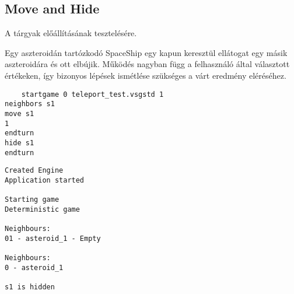 \documentclass[../../projlab]{subfiles}
\begin{document}
\subsection{Move and Hide}
\begin{test-case-description}
    A tárgyak előállításának tesztelésére.
\end{test-case-description}
\begin{test-case-function}
    Egy aszteroidán tartózkodó SpaceShip egy kapun keresztül ellátogat egy másik aszteroidára és ott elbújik. \newline
    Működés nagyban függ a felhasználó által választott értékeken, így bizonyos lépések ismétlése szükséges a várt eredmény eléréséhez.
\end{test-case-function}
\begin{test-case-input}

    
    \begin{verbatim}
    startgame 0 teleport_test.vsgstd 1
neighbors s1
move s1
1
endturn
hide s1
endturn
    \end{verbatim}
\end{test-case-input}
\begin{test-case-output}
\begin{verbatim}
Created Engine
Application started

Starting game
Deterministic game

Neighbours:
01 - asteroid_1 - Empty

Neighbours:
0 - asteroid_1

s1 is hidden
\end{verbatim}
\end{test-case-output}
\end{document}
